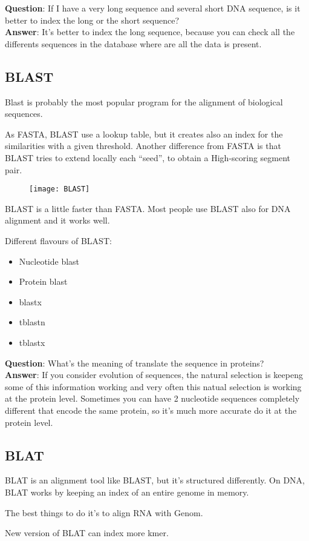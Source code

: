 \textbf{Question}: If I have a very long sequence and several short DNA
sequence, is it better to index the long or the short sequence? \\

\textbf{Answer}: It's better to index the long sequence, because you can
check all the differents sequences in the database where are all the data is
present.

\subsection{BLAST}

Blast is probably the most popular program for the alignment of biological
sequences.

As FASTA, BLAST use a lookup table, but it creates also an index for the
similarities with a given threshold. Another difference from FASTA is that
BLAST tries to extend locally each ``seed'', to obtain a High-scoring segment
pair.

\begin{figure}[H]
  \centering
  \texttt{[image: BLAST]}
  \label{fig:blast}
\end{figure}

BLAST is a little faster than FASTA. Most people use BLAST also for DNA
alignment and it works well.

Different flavours of BLAST:
\begin{itemize}
  \item Nucleotide blast
  \item Protein blast
  \item blastx
  \item tblastn
  \item tblastx
\end{itemize}

\textbf{Question}: What's the meaning of translate the sequence in proteins? \\

\textbf{Answer}: If you consider evolution of sequences, the natural selection
is keepeng some of this information working and very often this natual
selection is working at the protein level.
Sometimes you can have 2 nucleotide sequences completely different that
encode the same protein, so it's much more accurate do it at the protein level.

\subsection{BLAT}

BLAT is an alignment tool like BLAST, but it's structured differently. On DNA,
BLAT works by keeping an index of an entire genome in memory.

The best things to do it's to align RNA with Genom.

New version of BLAT can index more kmer.
